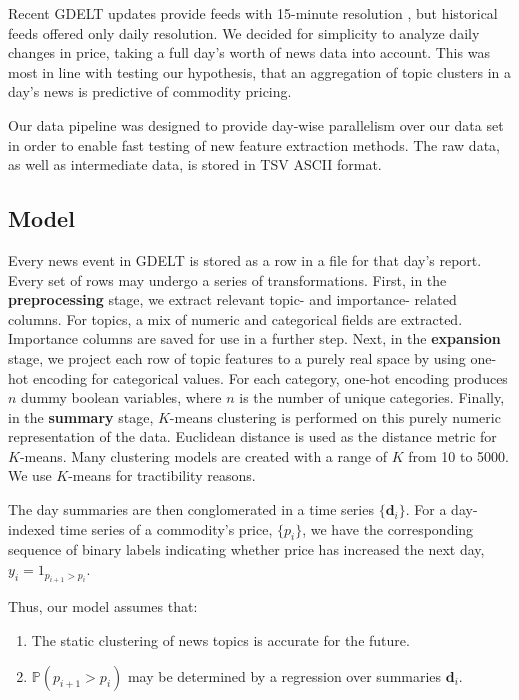 
Recent GDELT updates provide feeds with 15-minute resolution \cite{GDELT2}, but historical feeds offered only daily resolution. We decided for simplicity to analyze daily changes in price, taking a full day's worth of news data into account. This was most in line with testing our hypothesis, that an aggregation of topic clusters in a day's news is predictive of commodity pricing.

Our data pipeline was designed to provide day-wise parallelism over our data set in order to enable fast testing of new feature extraction methods. The raw data, as well as intermediate data, is stored in TSV ASCII format.

\subsection{Model}

Every news event in GDELT is stored as a row in a file for that day's report. Every set of rows may undergo a series of transformations. First, in the \textbf{preprocessing} stage, we extract relevant topic- and importance- related columns. For topics, a mix of numeric and categorical fields are extracted. Importance columns are saved for use in a further step. Next, in the \textbf{expansion} stage, we project each row of topic features to a purely real space by using one-hot encoding for categorical values. For each category, one-hot encoding produces $n$ dummy boolean variables, where $n$ is the number of unique categories. Finally, in the \textbf{summary} stage, $K$-means clustering is performed on this purely numeric representation of the data. Euclidean distance is used as the distance metric for $K$-means. Many clustering models are created with a range of $K$ from 10 to 5000. We use $K$-means for tractibility reasons.

The day summaries are then conglomerated in a time series $\{\textbf{d}_i\}$. For a day-indexed time series of a commodity's price, $\{p_i\}$, we have the corresponding sequence of binary labels indicating whether price has increased the next day, $y_i=1_{p_{i+1}>p_i}$.

Thus, our model assumes that:
\begin{enumerate}
\item The static clustering of news topics is accurate for the future.
\item $\mathbb{P}(p_{i+1}>p_i)$ may be determined by a regression over summaries $\textbf{d}_i$. 
\end{enumerate}

